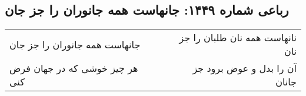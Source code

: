 \begin{center}
\section*{رباعی شماره ۱۴۴۹: جانهاست همه جانوران را جز جان}
\label{sec:1449}
\begin{longtable}{l p{0.5cm} r}
جانهاست همه جانوران را جز جان
&&
نانهاست همه نان طلبان را جز نان
\\
هر چیز خوشی که در جهان فرض کنی
&&
آن را بدل و عوض برود جز جانان
\\
\end{longtable}
\end{center}
